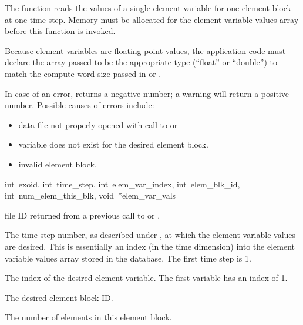 The function  reads the values of a single
element variable for one element block at one time step. Memory must
be allocated for the element variable values array before this
function is invoked.

Because element variables are floating point values, the application
code must declare the array passed to be the appropriate type
(``float'' or ``double'') to match the compute word size passed in
 or .


In case of an error,  returns a negative
number; a warning will return a positive number. Possible causes of
errors include:

\begin{itemize}
 \item data file not properly opened with call to 
 or 

 \item variable does not exist for the desired element block.

 \item invalid element block.
\end{itemize}

{int~exoid,
int~time_step,
int~elem_var_index,
int~elem_blk_id,
int~num_elem_this_blk,
void~*elem_var_vals}

\begin{parameters}
\item[{int exoid \R{}}]
\exo{} file ID returned from a previous call to  or
.

\item[{int time_step \R{}}]
The time step number, as described under , at
which the element variable values are desired. This is essentially an
index (in the time dimension) into the element variable values array
stored in the database. The first time step is 1.

\item[{int elem_var_index \R{}}]
The index of the desired element variable. The first variable
has an index of 1.

\item[{int elem_blk_id \R{}}]
The desired element block ID.

\item[{int num_elem_this_blk \R{}}]
The number of elements in this element block.
\end{parameters}

